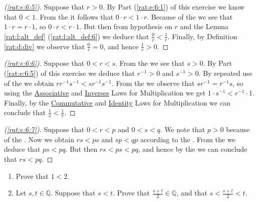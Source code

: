 \begin{proof}[(\ref{rat:e:6:5})]
	Suppose that $r > 0$. By Part (\ref{rat:e:6:1}) of this exercise we know that $0 < 1$. From the  it follows that $0 \cdot r < 1 \cdot r$. Because of the  we see that $1 \cdot r = r \cdot 1$, so $0 \cdot r < r \cdot 1$. But then from hypothesis on $r$ and the Lemma \ref{rat:l:alt_def} (\ref{rat:l:alt_def:6}) we deduce that $\frac{0}{r} < \frac{1}{r}$. Finally, by Definition \ref{rat:d:div} we observe that $\frac{0}{r} = 0$, and hence $\frac{1}{r} > 0$.
\end{proof}

\begin{proof}[(\ref{rat:e:6:6})]
	Suppose that $0 < r < s$. From the  we see that $s > 0$. By Part (\ref{rat:e:6:5}) of this exercise we deduce that $r^{-1} > 0$ and $s^{-1} > 0$. By repeated use of the  we obtain $r r^{-1} s^{-1} < s r^{-1} s^{-1}$. From the  we observe that $s r^{-1} = r^{-1} s$, so using the \hyperref[rat:t:props:associative_mult]{Associative} and \hyperref[rat:t:props:inverses_mult]{Inverses} Laws for Multiplication we get $1 \cdot s^{-1} < r^{-1} \cdot 1$. Finally, by the \hyperref[rat:t:props:commutative_mult]{Commutative} and \hyperref[rat:t:props:identity_mult]{Identity} Laws for Multiplication we can conclude that $\frac{1}{s} < \frac{1}{r}$.
\end{proof}

\begin{proof}[(\ref{rat:e:6:7})]
	Suppose that $0 < r < p$ and $0 < s < q$. We note that $p > 0$ because of the . Now we obtain $r s < p s$ and $s p < q p$ according to the . From the  we deduce that $p s < p q$. But then $r s < p s < p q$, and hence by the  we can conclude that $r s < p q$.
\end{proof}


\Newpage
\begin{exercise} %
	\label{rat:e:7}
	\hfill
	\begin{enumerate}
		\item Prove that $1 < 2$. \label{rat:e:7:1}
		\item Let $s, t \in \mathbb{Q}$. Suppose that $s < t$. Prove that $\frac{s + t}{2} \in \mathbb{Q}$, and that $s < \frac{s + t}{2} < t$. \label{rat:e:7:2}
	\end{enumerate}
\end{exercise}

